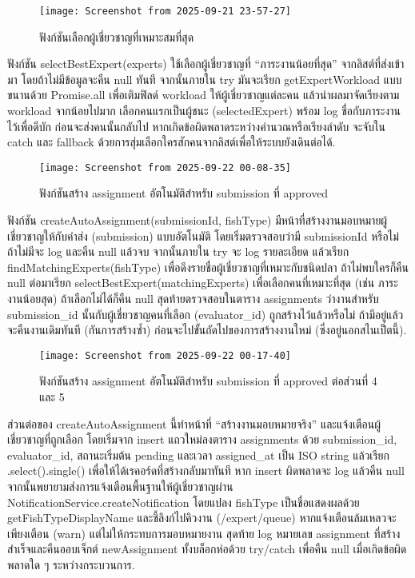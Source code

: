 \newpage

\begin{figure}[h]
	\centering
	\texttt{[image: Screenshot from 2025-09-21 23-57-27]}
	\caption{ฟังก์ชันเลือกผู้เชี่ยวชาญที่เหมาะสมที่สุด}
\end{figure}

\indent ฟังก์ชัน selectBestExpert(experts) ใช้เลือกผู้เชี่ยวชาญที่ “ภาระงานน้อยที่สุด” จากลิสต์ที่ส่งเข้ามา โดยถ้าไม่มีข้อมูลจะคืน null ทันที จากนั้นภายใน try มันจะเรียก getExpertWorkload แบบขนานด้วย Promise.all เพื่อเติมฟิลด์ workload ให้ผู้เชี่ยวชาญแต่ละคน แล้วนำผลมาจัดเรียงตาม workload จากน้อยไปมาก เลือกคนแรกเป็นผู้ชนะ (selectedExpert) พร้อม log ชื่อกับภาระงานไว้เพื่อดีบัก ก่อนจะส่งคนนั้นกลับไป หากเกิดข้อผิดพลาดระหว่างคำนวณหรือเรียงลำดับ จะจับใน catch และ fallback ด้วยการสุ่มเลือกใครสักคนจากลิสต์เพื่อให้ระบบยังเดินต่อได้.

\vspace{\baselineskip}

\begin{figure}[h]
	\centering
	\texttt{[image: Screenshot from 2025-09-22 00-08-35]}
	\caption{ฟังก์ชันสร้าง assignment อัตโนมัติสำหรับ submission ที่ approved}
\end{figure}

\indent ฟังก์ชัน createAutoAssignment(submissionId, fishType) มีหน้าที่สร้างงานมอบหมายผู้เชี่ยวชาญให้กับคำส่ง (submission) แบบอัตโนมัติ โดยเริ่มตรวจสอบว่ามี submissionId หรือไม่ ถ้าไม่มีจะ log และคืน null แล้วจบ จากนั้นภายใน try จะ log รายละเอียด แล้วเรียก findMatchingExperts(fishType) เพื่อดึงรายชื่อผู้เชี่ยวชาญที่เหมาะกับชนิดปลา ถ้าไม่พบใครก็คืน null ต่อมาเรียก selectBestExpert(matchingExperts) เพื่อเลือกคนที่เหมาะที่สุด (เช่น ภาระงานน้อยสุด) ถ้าเลือกไม่ได้ก็คืน null สุดท้ายตรวจสอบในตาราง assignments ว่างานสำหรับ submission\_id นั้นกับผู้เชี่ยวชาญคนที่เลือก (evaluator\_id) ถูกสร้างไว้แล้วหรือไม่ ถ้ามีอยู่แล้วจะคืนงานเดิมทันที (กันการสร้างซ้ำ) ก่อนจะไปขั้นถัดไปของการสร้างงานใหม่ (ซึ่งอยู่นอกสไนเป็ตนี้).

\vspace{\baselineskip}

\begin{figure}[h]
	\centering
	\texttt{[image: Screenshot from 2025-09-22 00-17-40]}
	\caption{ฟังก์ชันสร้าง assignment อัตโนมัติสำหรับ submission ที่ approved ต่อส่วนที่ 4 และ 5}
\end{figure}

\indent ส่วนต่อของ createAutoAssignment นี้ทำหน้าที่ “สร้างงานมอบหมายจริง” และแจ้งเตือนผู้เชี่ยวชาญที่ถูกเลือก โดยเริ่มจาก insert แถวใหม่ลงตาราง assignments ด้วย submission\_id, evaluator\_id, สถานะเริ่มต้น pending และเวลา assigned\_at เป็น ISO string แล้วเรียก .select().single() เพื่อให้ได้เรคอร์ดที่สร้างกลับมาทันที หาก insert ผิดพลาดจะ log แล้วคืน null จากนั้นพยายามส่งการแจ้งเตือนพื้นฐานให้ผู้เชี่ยวชาญผ่าน NotificationService.createNotification โดยแปลง fishType เป็นชื่อแสดงผลด้วย getFishTypeDisplayName และชี้ลิงก์ไปคิวงาน (/expert/queue) หากแจ้งเตือนล้มเหลวจะเพียงเตือน (warn) แต่ไม่ให้กระทบการมอบหมายงาน สุดท้าย log หมายเลข assignment ที่สร้างสำเร็จและคืนออบเจ็กต์ newAssignment ทั้งบล็อกห่อด้วย try/catch เพื่อคืน null เมื่อเกิดข้อผิดพลาดใด ๆ ระหว่างกระบวนการ.

\clearpage